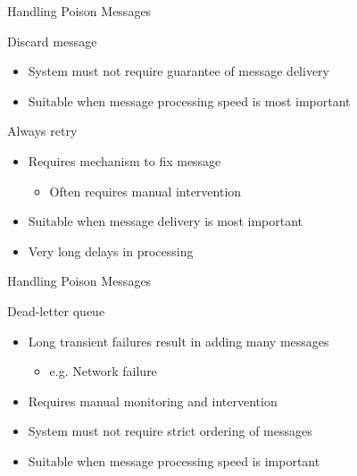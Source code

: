 \documentclass{slide}
\begin{document}
\begin{frame}{Handling Poison Messages}
    \vspace{1mm}
    {\LARGE
        Discard message
        \begin{itemize}
            \Large\item System must not require guarantee of message delivery
            \Large\item Suitable when message processing speed is most important
        \end{itemize}
        \pause
        \vspace{3mm}
        Always retry
        \begin{itemize}
            \Large\item Requires mechanism to fix message
            \begin{itemize}
                \large\item Often requires manual intervention
            \end{itemize}
            \Large\item Suitable when message delivery is most important
            \Large\item Very long delays in processing
        \end{itemize}
    }
\end{frame}

\begin{frame}{Handling Poison Messages}
    \vspace{1mm}
    {\LARGE
        Dead-letter queue
        \begin{itemize}
            \Large\item Long transient failures result in adding many messages
            \begin{itemize}
                \large\item e.g. Network failure
            \end{itemize}
            \Large\item Requires manual monitoring and intervention
            \Large\item System must not require strict ordering of messages
            \Large\item Suitable when message processing speed is important
        \end{itemize}
    }
\end{frame}
\end{document}
